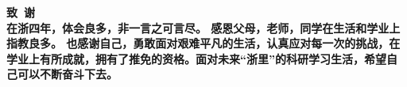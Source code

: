 \cleardoublepage{}
\begin{center}
    \bfseries {} 致~谢 \\
    在浙四年，体会良多，非一言之可言尽。
    感恩父母，老师，同学在生活和学业上指教良多。 也感谢自己，勇敢面对艰难平凡的生活，认真应对每一次的挑战，在学业上有所成就，拥有了推免的资格。面对未来“浙里”的科研学习生活，希望自己可以不断奋斗下去。

\end{center}
